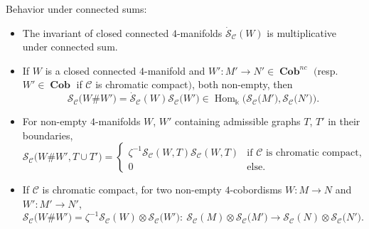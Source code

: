 \documentclass[pdftex]{sigma}
\numberwithin{equation}{section}
\numberwithin{theorem}{section}
\numberwithin{proposition}{section}
\numberwithin{definition}{section}
\numberwithin{lemma}{section}
\numberwithin{corollary}{section}
\numberwithin{remark}{section}
\numberwithin{example}{section}
\newcommand{\cat}{\mathcal{C}}
\newcommand{\Hom}{\operatorname{Hom}}
\newcommand{\FK}{{\Bbbk}}
\newcommand{\TSkein}{{\mathscr{S}}}
\newcommand{\cob}{\operatorname{\textbf{Cob}}}
\begin{document}
\begin{proposition}\label{P:conn} Behavior under connected sums:
 \begin{itemize}\itemsep=0pt
 \item The invariant of closed connected $4$-manifolds
 $\dot\TSkein_\cat(W)$ is multiplicative under connected sum.
 \item If $W$ is a closed connected $4$-manifold and
 $W'\colon M'\to N'\in\cob^{nc}$ $($resp. $W'\in\cob$ if $\cat$ is chromatic compact$)$, both non-empty, then
 \[
 \TSkein_\cat\bigl(W\#W'\bigr)=\dot\TSkein_\cat(W)\TSkein_\cat\bigl(W'\bigr)
 \in\Hom_\FK\bigl(\TSkein_\cat\bigl(M'\bigr),\TSkein_\cat\bigl(N'\bigr)\bigr).
 \]
 \item For non-empty $4$-manifolds $W$, $W'$ containing admissible graphs
 $T$, $T'$ in their boundaries,
 \[\TSkein_\cat\bigl(W\#W',T\cup T'\bigr)=
 \begin{cases}
 \zeta^{-1}\TSkein_\cat(W,T)\TSkein_\cat(W,T)&\text{if $\cat$ is chromatic compact,}\\
 0&\text{else.}
 \end{cases}\]

 \item If $\cat$ is chromatic compact, for two non-empty $4$-cobordisms
 $W\colon\! M\to N$ and ${W'\colon\! M'\to N'}$,
 \[
 \TSkein_\cat\bigl(W\#W'\bigr)=\zeta^{-1}\TSkein_\cat(W)\otimes\TSkein_\cat\bigl(W'\bigr)\colon \
 \TSkein_\cat(M)\otimes\TSkein_\cat\bigl(M'\bigr)\to\TSkein_\cat(N)\otimes\TSkein_\cat\bigl(N'\bigr).
 \]
 \end{itemize}
\end{proposition}
\end{document}
